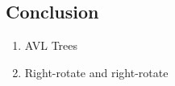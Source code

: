 \documentclass[aspectratio=169, 14pt]{beamer}
\begin{document}

    
    



\begin{frame}
  
    \section{\textcolor{darkmidnightblue}{Conclusion}} 
  
    \begin{enumerate}
      \item AVL Trees
      \item Right-rotate and right-rotate
    \end{enumerate}
  \end{frame}
\end{document}

